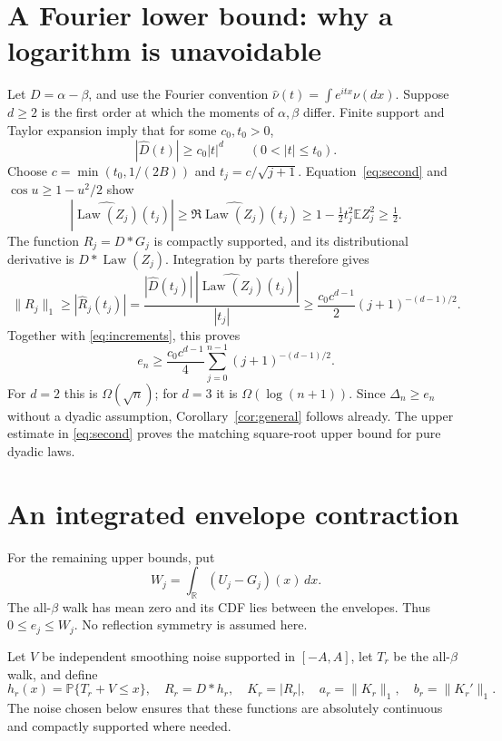 \documentclass[11pt,a4paper]{article}
\newcommand{\E}{\mathbb E}
\newcommand{\Prb}{\mathbb P}
\newcommand{\Law}{\operatorname{Law}}
\begin{document}
\section{A Fourier lower bound: why a logarithm is unavoidable}
Let $D=\alpha-\beta$, and use the Fourier convention
$\widehat\nu(t)=\int e^{itx}\nu(dx)$.
Suppose $d\ge2$ is the first order at which the moments of $\alpha,\beta$
differ. Finite support and Taylor expansion imply that for some
$c_0,t_0>0$,
\begin{equation}\label{eq:fourierD}
|\widehat D(t)|\ge c_0|t|^d\qquad(0<|t|\le t_0).
\end{equation}
Choose $c=\min(t_0,1/(2B))$ and $t_j=c/\sqrt{j+1}$.
Equation~\eqref{eq:second} and $\cos u\ge1-u^2/2$ show
\[
|\widehat{\Law(Z_j)}(t_j)|\ge
\Re\widehat{\Law(Z_j)}(t_j)
\ge1-\tfrac12t_j^2\E Z_j^2\ge\tfrac12.
\]
The function $R_j=D*G_j$ is compactly supported, and its distributional
derivative is $D*\Law(Z_j)$. Integration by parts therefore gives
\[
\|R_j\|_1\ge|\widehat R_j(t_j)|
=\frac{|\widehat D(t_j)|\,
|\widehat{\Law(Z_j)}(t_j)|}{|t_j|}
\ge\frac{c_0c^{d-1}}2(j+1)^{-(d-1)/2}.
\]
Together with \eqref{eq:increments}, this proves
\begin{equation}\label{eq:lower}
e_n\ge\frac{c_0c^{d-1}}4
\sum_{j=0}^{n-1}(j+1)^{-(d-1)/2}.
\end{equation}
For $d=2$ this is $\Omega(\sqrt n)$; for $d=3$ it is
$\Omega(\log(n+1))$. Since $\Delta_n\ge e_n$ without a dyadic
assumption, Corollary~\ref{cor:general} follows already.
The upper estimate in \eqref{eq:second} proves the matching square-root
upper bound for pure dyadic laws.

\section{An integrated envelope contraction}
For the remaining upper bounds, put
\[
W_j=\int_{\mathbb R}(U_j-G_j)(x)\,dx.
\]
The all-$\beta$ walk has mean zero and its CDF lies between the envelopes.
Thus $0\le e_j\le W_j$. No reflection symmetry is assumed here.

Let $V$ be independent smoothing noise supported in $[-A,A]$, let $T_r$
be the all-$\beta$ walk, and define
\[
h_r(x)=\Prb\{T_r+V\le x\},\quad
R_r=D*h_r,\quad K_r=|R_r|,\quad
 a_r=\|K_r\|_1,\quad b_r=\|K_r'\|_1.
\]
The noise chosen below ensures that these functions are absolutely
continuous and compactly supported where needed.
\end{document}
